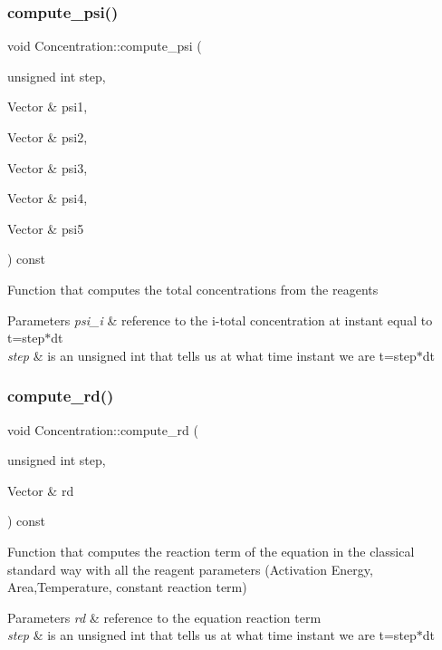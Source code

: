 \subsubsection{\texorpdfstring{compute\+\_\+psi()}{compute\_psi()}}
{\footnotesize\ttfamily void Concentration\+::compute\+\_\+psi (\begin{DoxyParamCaption}\item[{unsigned int}]{step,  }\item[{Vector \&}]{psi1,  }\item[{Vector \&}]{psi2,  }\item[{Vector \&}]{psi3,  }\item[{Vector \&}]{psi4,  }\item[{Vector \&}]{psi5 }\end{DoxyParamCaption}) const}

Function that computes the total concentrations from the reagents 
\begin{DoxyParams}{Parameters}
{\em psi\+\_\+i} & reference to the i-\/total concentration at instant equal to t=step$\ast$dt \\
\hline
{\em step} & is an unsigned int that tells us at what time instant we are t=step$\ast$dt \\
\hline
\end{DoxyParams}
\mbox{\label{classConcentration_a64980d7bc4cc7d90f4cf16496ed2db59}} 
\subsubsection{\texorpdfstring{compute\+\_\+rd()}{compute\_rd()}}
{\footnotesize\ttfamily void Concentration\+::compute\+\_\+rd (\begin{DoxyParamCaption}\item[{unsigned int}]{step,  }\item[{Vector \&}]{rd }\end{DoxyParamCaption}) const}

Function that computes the reaction term of the equation in the classical standard way with all the reagent parameters (Activation Energy, Area,Temperature, constant reaction term) 
\begin{DoxyParams}{Parameters}
{\em rd} & reference to the equation reaction term \\
\hline
{\em step} & is an unsigned int that tells us at what time instant we are t=step$\ast$dt \\
\hline
\end{DoxyParams}
\mbox{\label{classConcentration_ae8ecace885fbce740b7b9a7708ffba89}} 
